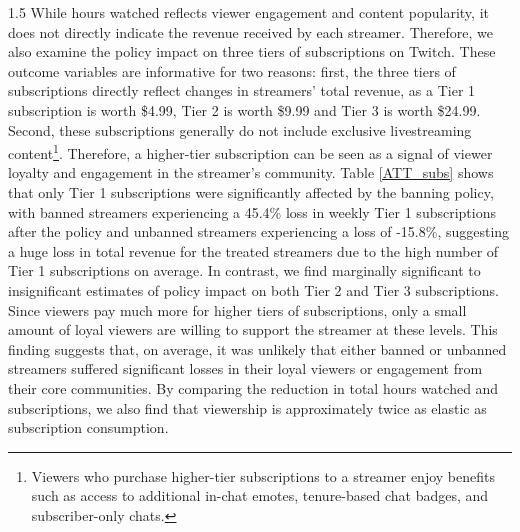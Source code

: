 \documentclass[a4paper,12pt]{article}
\begin{document}
\begin{spacing}{1.5}
While hours watched reflects viewer engagement and content popularity, it does not directly indicate the revenue received by each streamer. Therefore, we also examine the policy impact on three tiers of subscriptions on Twitch. These outcome variables are informative for two reasons: first, the three tiers of subscriptions directly reflect changes in streamers' total revenue, as a Tier 1 subscription is worth \$4.99, Tier 2 is worth \$9.99 and Tier 3 is worth \$24.99. Second, these subscriptions generally do not include exclusive livestreaming content\footnote{Viewers who purchase higher-tier subscriptions to a streamer enjoy benefits such as access to additional in-chat emotes, tenure-based chat badges, and subscriber-only chats.}. Therefore, a higher-tier subscription can be seen as a signal of viewer loyalty and engagement in the streamer's community. Table \ref{ATT_subs} shows that only Tier 1 subscriptions were significantly affected by the banning policy, with banned streamers experiencing a 45.4\% loss in weekly Tier 1 subscriptions after the policy and unbanned streamers experiencing a loss of -15.8\%, suggesting a huge loss in total revenue for the treated streamers due to the high number of Tier 1 subscriptions on average. In contrast, we find marginally significant to insignificant estimates of policy impact on both Tier 2 and Tier 3 subscriptions. Since viewers pay much more for higher tiers of subscriptions, only a small amount of loyal viewers are willing to support the streamer at these levels. This finding suggests that, on average, it was unlikely that either banned or unbanned streamers suffered significant losses in their loyal viewers or engagement from their core communities. By comparing the reduction in total hours watched and subscriptions, we also find that viewership is approximately twice as elastic as subscription consumption.


\end{spacing}
\end{document}

